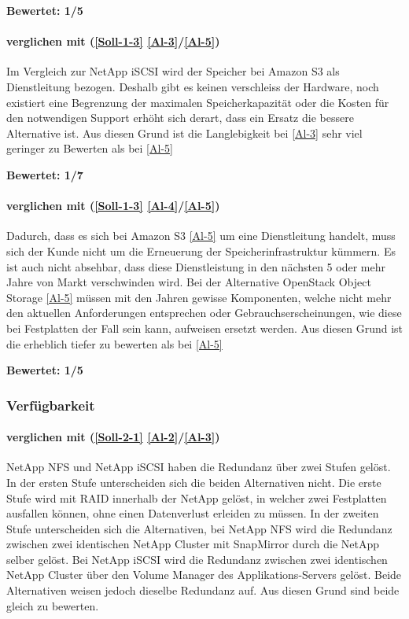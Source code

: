 \textbf{Bewertet: 1/5}

\paragraph*{  verglichen mit  (\ref{Soll-1-3} \ref{Al-3}/\ref{Al-5})}
Im Vergleich zur NetApp iSCSI wird der Speicher bei Amazon S3 als Dienstleitung bezogen. Deshalb gibt es keinen verschleiss der Hardware, noch existiert eine Begrenzung der maximalen Speicherkapazität oder die Kosten für den notwendigen Support erhöht sich derart, dass ein Ersatz die bessere Alternative ist.
Aus diesen Grund ist die Langlebigkeit bei  \ref{Al-3} sehr viel geringer zu Bewerten als bei  \ref{Al-5}

\textbf{Bewertet: 1/7}


\paragraph*{  verglichen mit  (\ref{Soll-1-3} \ref{Al-4}/\ref{Al-5})}
Dadurch, dass es sich bei Amazon S3 \ref{Al-5} um eine Dienstleitung handelt, muss sich der Kunde nicht um die Erneuerung der Speicherinfrastruktur kümmern. Es ist auch nicht absehbar, dass diese Dienstleistung in den nächsten 5 oder mehr Jahre von Markt verschwinden wird. Bei der Alternative OpenStack Object Storage \ref{Al-5} müssen mit den Jahren gewisse Komponenten, welche nicht mehr den aktuellen Anforderungen entsprechen oder Gebrauchserscheinungen, wie diese bei Festplatten der Fall sein kann, aufweisen ersetzt werden. Aus diesen Grund ist die  erheblich tiefer zu bewerten als bei \ref{Al-5}

\textbf{Bewertet: 1/5}


\subsubsection{Verfügbarkeit}

\paragraph*{  verglichen mit  (\ref{Soll-2-1} \ref{Al-2}/\ref{Al-3})}
NetApp NFS und NetApp iSCSI haben die Redundanz über zwei Stufen gelöst. In der ersten Stufe unterscheiden sich die beiden Alternativen nicht. Die erste Stufe wird mit RAID innerhalb der NetApp gelöst, in welcher zwei Festplatten ausfallen können, ohne einen Datenverlust erleiden zu müssen. In der zweiten Stufe unterscheiden sich die Alternativen, bei NetApp NFS wird die Redundanz zwischen zwei identischen NetApp Cluster mit SnapMirror durch die NetApp selber gelöst. Bei NetApp iSCSI wird die Redundanz zwischen zwei identischen NetApp Cluster über den Volume Manager des Applikations-Servers gelöst. Beide Alternativen weisen jedoch dieselbe Redundanz auf. Aus diesen Grund sind beide gleich zu bewerten.

